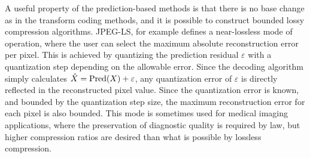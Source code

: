       A useful property of the prediction-based methods is that there is no base change as in the transform coding methods, and it is possible to construct bounded lossy compression algorithms. JPEG-LS, for example defines a near-lossless mode of operation, where the user can select the maximum absolute reconstruction error per pixel. This is achieved by quantizing the prediction residual $\varepsilon$ with a quantization step depending on the allowable error. Since the decoding algorithm simply calculates $\hat{X} = \operatorname{Pred}(X) + \varepsilon$, any quantization error of $\varepsilon$ is directly reflected in the reconstructed pixel value. Since the quantization error is known, and bounded by the quantization step size, the maximum reconstruction error for each pixel is also bounded. This mode is sometimes used for medical imaging applications, where the preservation of diagnostic quality is required by law, but higher compression ratios are desired than what is possible by lossless compression.
  
  
  
  
  